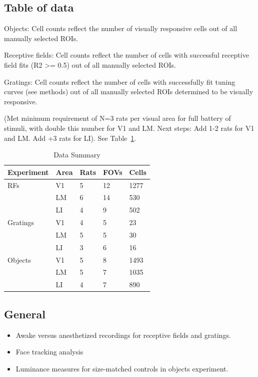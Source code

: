 \documentclass{article}
\begin{document}
\subsection{Table of data}
Objects:  Cell counts reflect the number of visually responsive cells out of all manually selected ROIs.

Receptive fields:  Cell counts reflect the number of cells with successful receptive field fits (R2 >= 0.5) out of all manually selected ROIs.  

Gratings:  Cell counts reflect the number of cells with successfully fit tuning curves (see methods) out of all manually selected ROIs determined to be visually responsive.

(Met minimum requirement of N=3 rats per visual area for full battery of stimuli, with double this number for V1 and LM. Next steps:  Add 1-2 rats for V1 and LM. Add +3 rats for LI). See Table~\ref{tab:table}. 

\begin{table}[h]
 \caption{Data Summary}
  \centering
  \begin{tabular}{lllll}
    \toprule
    Experiment & Area & Rats & FOVs & Cells \\
    \midrule
    RFs & V1  & 5 & 12 & 1277     \\
        & LM  & 6 & 14 & 530      \\
        & LI  & 4 & 9 & 502      \\
    \midrule
    Gratings & V1  & 4 & 5 & 23     \\
             & LM  & 5 & 5 & 30      \\
             & LI  & 3 & 6 & 16      \\
    \midrule
    Objects  & V1  & 5 & 8 & 1493     \\
             & LM  & 5 & 7 & 1035      \\
             & LI  & 4 & 7 & 890      \\
    \bottomrule
  \end{tabular}
  \label{tab:table}
\end{table}

\subsection{General}
\begin{itemize}
\item Awake versus anesthetized recordings for receptive fields and gratings.
\item Face tracking analysis
\item Luminance measures for size-matched controls in objects experiment.
\end{itemize}
\end{document}
